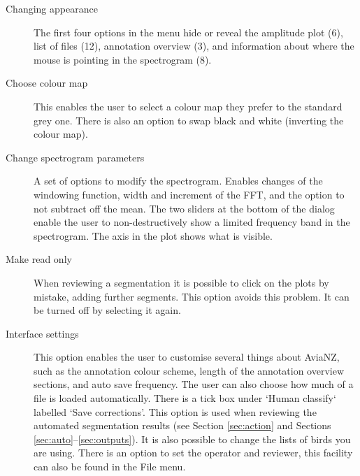 \documentclass{article}
\begin{document}
\begin{description}
\item [Changing appearance] The first four options in the menu hide or reveal the amplitude plot (6), list of files (12), annotation overview (3), and information about where the mouse is pointing in the spectrogram (8). 
\item [Choose colour map] This enables the user to select a colour map they prefer to the standard grey one. There is also an option to swap black and white (inverting the colour map). 
\item [Change spectrogram parameters] A set of options to modify the spectrogram. Enables changes of the windowing function, width and increment of the FFT, and the option to not subtract off the mean. %
The two sliders at the bottom of the dialog enable the user to non-destructively show a limited frequency band in the spectrogram. The axis in the plot shows what is visible. 
\item [Make read only] When reviewing a segmentation it is possible to click on the plots by mistake, adding further segments. This option avoids this problem. It can be turned off by selecting it again. 
\item [Interface settings] This option enables the user to customise several things about AviaNZ, such as the annotation colour scheme, length of the annotation overview sections, and auto save frequency. The user can also choose how much of a file is loaded automatically. There is a tick box under `Human classify` labelled `Save corrections'. This option is used when reviewing the automated segmentation results  (see Section \ref{sec:action} and Sections \ref{sec:auto}--\ref{sec:outputs}). It is also possible to change the lists of birds you are using. 
There is an option to set the operator and reviewer, this facility can also be found in the File menu.
\end{description}
\end{document}
